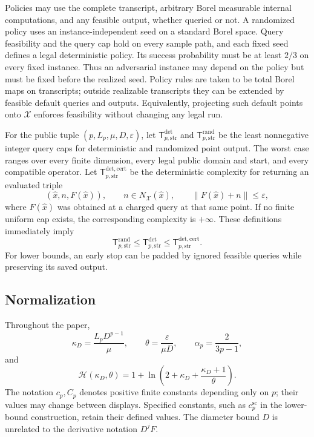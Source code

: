 \documentclass[11pt]{article}
\numberwithin{equation}{section}
\theoremstyle{definition}
\theoremstyle{remark}
\newcommand{\Tdet}{\mathsf T_{p,\mathrm{str}}^{\mathrm{det}}}
\newcommand{\Trand}{\mathsf T_{p,\mathrm{str}}^{\mathrm{rand}}}
\newcommand{\Tcert}{\mathsf T_{p,\mathrm{str}}^{\mathrm{det,cert}}}
\newcommand{\ap}{\alpha_p}
\begin{document}
Policies may use the complete transcript, arbitrary Borel measurable
internal computations, and any feasible output, whether queried or not.
A randomized policy uses an instance-independent seed on a standard
Borel space. Query feasibility and the query cap hold on every sample
path, and each fixed seed defines a legal deterministic policy.
Its success probability must be at least $2/3$ on every fixed instance.
Thus an adversarial instance may depend on the policy but must be fixed
before the realized seed. Policy rules are taken to be total Borel maps
on transcripts; outside realizable transcripts they can be extended by
feasible default queries and outputs. Equivalently, projecting such
default points onto $\mathcal X$ enforces feasibility without changing
any legal run.

For the public tuple $(p,L_p,\mu,D,\varepsilon)$, let $\Tdet$ and
$\Trand$ be the least nonnegative integer query caps for deterministic
and randomized point output. The worst case ranges over every finite
dimension, every legal public domain and start, and every compatible
operator. Let $\Tcert$ be the deterministic complexity for returning
an evaluated triple
\begin{equation}\label{eq:evaluated-certificate}
(\widehat x,n,F(\widehat x)),\qquad
n\in N_{\mathcal X}(\widehat x),\qquad
\|F(\widehat x)+n\|\le\varepsilon,
\end{equation}
where $F(\widehat x)$ was obtained at a charged query at that same point.
If no finite uniform cap exists, the corresponding complexity is
$+\infty$. These definitions immediately imply
\begin{equation}\label{eq:complexity-order}
\Trand\le\Tdet\le\Tcert.
\end{equation}
For lower bounds, an early stop can be padded by ignored feasible
queries while preserving its saved output.

\subsection{Normalization}
Throughout the paper,
\begin{equation}\label{eq:normalized-parameters}
\kappa_D=\frac{L_pD^{p-1}}{\mu},\qquad
\theta=\frac{\varepsilon}{\mu D},\qquad
\ap=\frac{2}{3p-1},
\end{equation}
and
\begin{equation}\label{eq:public-log}
\mathcal H(\kappa_D,\theta)
=1+\ln\!\left(2+\kappa_D+\frac{\kappa_D+1}{\theta}\right).
\end{equation}
The notation $c_p,C_p$ denotes positive finite constants depending only
on $p$; their values may change between displays. Specified constants,
such as $c_p^{\mathrm{sc}}$ in the lower-bound construction, retain their
defined values. The diameter bound $D$ is unrelated to the derivative
notation $D^jF$.
\end{document}
